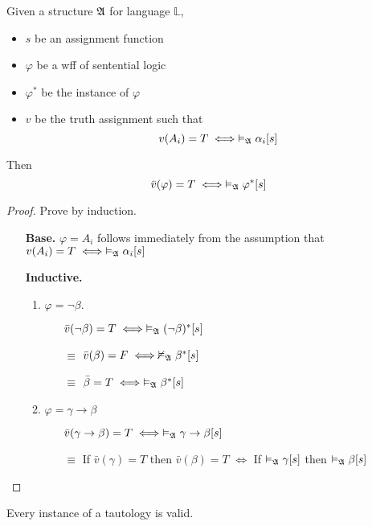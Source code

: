 \begin{lemma}
    Given a structure $\mathfrak{A}$ for language $\mathbb{L}$,
    \begin{itemize}
        \item $s$ be an assignment function
        \item $\varphi$ be a wff of sentential logic
        \item $\varphi^\ast$ be the instance of $\varphi$
        \item $v$ be the truth assignment such that
        \[ v(A_i) = T \iff \vDash_{\mathfrak{A}}\alpha_i[s] \]
    \end{itemize}
    Then
    \[ \bar{v}(\varphi) = T \iff \vDash_{\mathfrak{A}}\varphi^\ast[s] \]
\end{lemma}
\begin{proof}
    Prove by induction.
    \begin{itemize}
        \item[] \textbf{Base.} $\varphi = A_i$ follows immediately from the assumption that $v(A_i) = T \iff \vDash_{\mathfrak{A}}\alpha_i[s]$
        \item[] \textbf{Inductive.} \begin{enumerate}
            \item $\varphi = \neg \beta$.
            \begin{itemize}
                \item[] $\bar{v}(\neg\beta) = T \iff \vDash_{\mathfrak{A}}(\neg\beta)^\ast[s]$
                \item[$\equiv$] $\bar{v}(\beta) = F \iff \nvDash_{\mathfrak{A}}\beta^\ast[s]$ 
                \item[$\equiv$] $\bar{\beta} = T \iff \vDash_{\mathfrak{A}}\beta^\ast[s]$
            \end{itemize}
            \item $\varphi = \gamma \to \beta$
            \begin{itemize}
                \item[] $\bar{v}(\gamma\to\beta) = T \iff \vDash_{\mathfrak{A}}\gamma\to\beta[s]$
                \item[$\equiv$] If $\bar{v}(\gamma) = T$ then $\bar{v}(\beta) = T$ $\iff$ If $\vDash_{\mathfrak{A}}\gamma[s]$ then $\vDash_{\mathfrak{A}}\beta[s]$ 
            \end{itemize}
        \end{enumerate}
    \end{itemize}
\end{proof}

\begin{corollary}
    Every instance of a tautology is valid.
\end{corollary}

